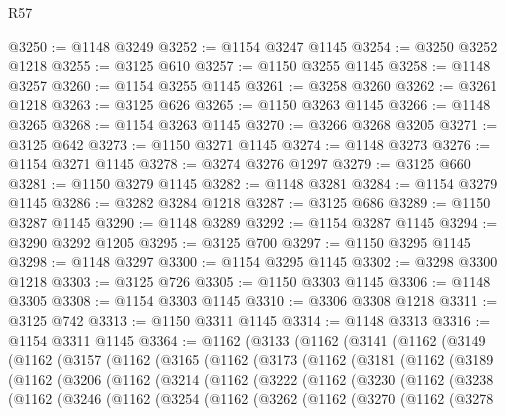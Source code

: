 \begin{lexlean}{R57}
\begin{coremodule}
@3250 := @1148 @3249
@3252 := @1154 @3247 @1145
@3254 := @3250 @3252 @1218
@3255 := @3125 @610
@3257 := @1150 @3255 @1145
@3258 := @1148 @3257
@3260 := @1154 @3255 @1145
@3261 := @3258 @3260
@3262 := @3261 @1218
@3263 := @3125 @626
@3265 := @1150 @3263 @1145
@3266 := @1148 @3265
@3268 := @1154 @3263 @1145
@3270 := @3266 @3268 @3205
@3271 := @3125 @642
@3273 := @1150 @3271 @1145
@3274 := @1148 @3273
@3276 := @1154 @3271 @1145
@3278 := @3274 @3276 @1297
@3279 := @3125 @660
@3281 := @1150 @3279 @1145
@3282 := @1148 @3281
@3284 := @1154 @3279 @1145
@3286 := @3282 @3284 @1218
@3287 := @3125 @686
@3289 := @1150 @3287 @1145
@3290 := @1148 @3289
@3292 := @1154 @3287 @1145
@3294 := @3290 @3292 @1205
@3295 := @3125 @700
@3297 := @1150 @3295 @1145
@3298 := @1148 @3297
@3300 := @1154 @3295 @1145
@3302 := @3298 @3300 @1218
@3303 := @3125 @726
@3305 := @1150 @3303 @1145
@3306 := @1148 @3305
@3308 := @1154 @3303 @1145
@3310 := @3306 @3308 @1218
@3311 := @3125 @742
@3313 := @1150 @3311 @1145
@3314 := @1148 @3313
@3316 := @1154 @3311 @1145
@3364 := @1162
    (@3133
      (@1162
        (@3141
          (@1162
            (@3149
              (@1162
                (@3157
                  (@1162
                    (@3165
                      (@1162
                        (@3173
                          (@1162
                            (@3181
                              (@1162
                                (@3189
                                  (@1162
                                    (@3206
                                      (@1162
                                        (@3214
                                          (@1162
                                            (@3222
                                              (@1162
                                                (@3230
                                                  (@1162
                                                    (@3238
                                                      (@1162
                                                        (@3246
                                                          (@1162
                                                            (@3254
                                                              (@1162
                                                                (@3262
                                                                  (@1162
                                                                    (@3270
                                                                      (@1162
                                                                        (@3278

\end{coremodule}
\end{lexlean}
